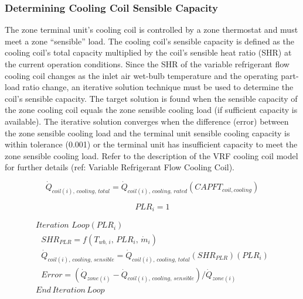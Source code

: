 \subsubsection{Determining Cooling Coil Sensible Capacity}\label{determining-cooling-coil-sensible-capacity}

The zone terminal unit's cooling coil is controlled by a zone thermostat and must meet a zone ``sensible'' load. The cooling coil's sensible capacity is defined as the cooling coil's total capacity multiplied by the coil's sensible heat ratio (SHR) at the current operation conditions. Since the SHR of the variable refrigerant flow cooling coil changes as the inlet air wet-bulb temperature and the operating part-load ratio change, an iterative solution technique must be used to determine the coil's sensible capacity. The target solution is found when the sensible capacity of the zone cooling coil equals the zone sensible cooling load (if sufficient capacity is available). The iterative solution converges when the difference (error) between the zone sensible cooling load and the terminal unit sensible cooling capacity is within tolerance (0.001) or the terminal unit has insufficient capacity to meet the zone sensible cooling load. Refer to the description of the VRF cooling coil model for further details (ref: Variable Refrigerant Flow Cooling Coil).

\begin{equation}
  \dot{Q}_{coil(i),\,cooling,\,total} = \dot{Q}_{coil(i),\,cooling,\,rated} \left( CAPFT_{coil,cooling} \right)
\end{equation}

\begin{equation}
  PLR_i = 1
\end{equation}

\begin{equation}
  \begin{array}{l}
    Iteration\,\,Loop(PLR_i) \\
    \,\,\,\,SHR_{PLR} = f \left( T_{wb,\,i},\,PLR_i ,\, \dot{m}_i \right) \\
    \,\,\,\, \dot{Q}_{coil(i),\,cooling,\,sensible} = \dot{Q}_{coil(i),\,cooling,\,total} \left( SHR_{PLR} \right) \left( PLR_i \right) \\
    \,\,\,\,Error = \left( \dot{Q}_{zone(i)} - \dot{Q}_{coil(i),\,cooling,\,sensible} \right) / \dot{Q}_{zone(i)} \\
    End\,Iteration\,Loop
  \end{array}
\end{equation}

